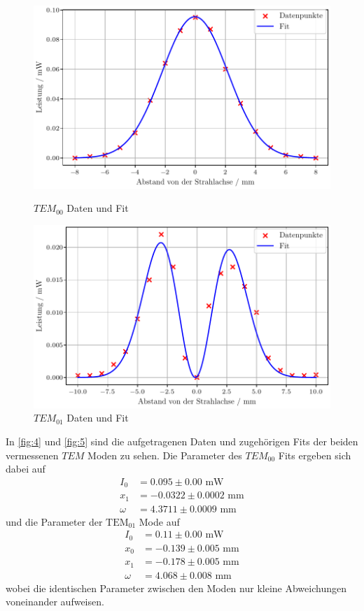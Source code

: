 \begin{figure}[H]
    \centering
    \begin{minipage}{0.48\textwidth}
        \centering
        \includegraphics[width=1\textwidth]{plots/TEM_00.pdf}
        \caption{$TEM_{00}$ Daten und Fit}
        \label{fig:4}
    \end{minipage}\hfill
    \begin{minipage}{0.48\textwidth}
        \centering
        \includegraphics[width=1\textwidth]{plots/TEM_01.pdf}
        \caption{$TEM_{01}$ Daten und Fit}
        \label{fig:5}
    \end{minipage}
\end{figure}
\noindent
In \autoref{fig:4} und \autoref{fig:5} sind die aufgetragenen Daten und zugehörigen Fits der beiden vermessenen $TEM$ Moden zu sehen. Die Parameter des $TEM_{00}$ Fits ergeben sich dabei auf 
\begin{align}
  I_0 &= 0.095 \pm 0.00 \, \, \mathrm{mW} \\
  x_1 &= -0.0322 \pm 0.0002 \, \, \mathrm{mm} \\
  \omega &= 4.3711 \pm 0.0009 \, \, \mathrm{mm} 
\end{align}
und die Parameter der $\text{TEM}_{01}$ Mode auf 
\begin{align}
  I_0 &= 0.11 \pm 0.00 \, \, \mathrm{mW} \\
  x_0 &= -0.139 \pm 0.005 \, \, \mathrm{mm} \\
  x_1 &= -0.178 \pm 0.005 \, \, \mathrm{mm} \\
  \omega &= 4.068 \pm 0.008 \, \, \mathrm{mm} 
\end{align}
wobei die identischen Parameter zwischen den Moden nur kleine Abweichungen voneinander aufweisen.
